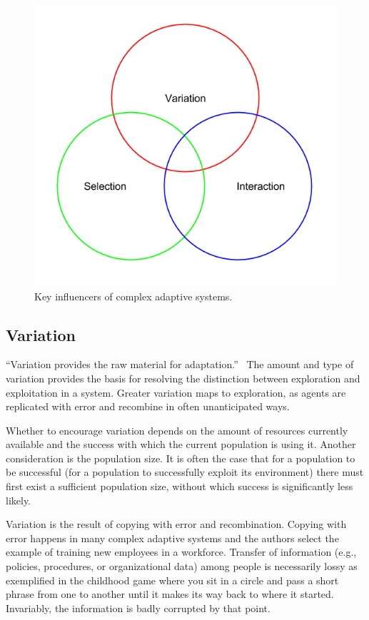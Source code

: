 \documentclass[jou,apacite]{apa6}
\begin{document}
\begin{figure}[htpb]
  \centering
  \includegraphics[width=0.9\columnwidth]{images/vis.png}
  \caption{Key influencers of complex adaptive systems.}
  \label{fig:vis}
\end{figure}

\subsection{Variation}
``Variation provides the raw material for adaptation.''~\cite[page 32]{Axelrod}  The amount and type of variation provides the basis for resolving the distinction between exploration and exploitation in a system.  Greater variation maps to exploration, as agents are replicated with error and recombine in often unanticipated ways.  

Whether to encourage variation depends on the amount of resources currently available and the success with which the current population is using it.  Another consideration is the population size.  It is often the case that for a population to be successful (for a population to successfully exploit its environment) there must first exist a sufficient population size, without which success is significantly less likely.

Variation is the result of copying with error and recombination.  Copying with error happens in many complex adaptive systems and the authors select the example of training new employees in a workforce.  Transfer of information (e.g., policies, procedures, or organizational data) among people is necessarily lossy as exemplified in the childhood game where you sit in a circle and pass a short phrase from one to another until it makes its way back to where it started.  Invariably, the
information is badly corrupted by that point.
\end{document}
